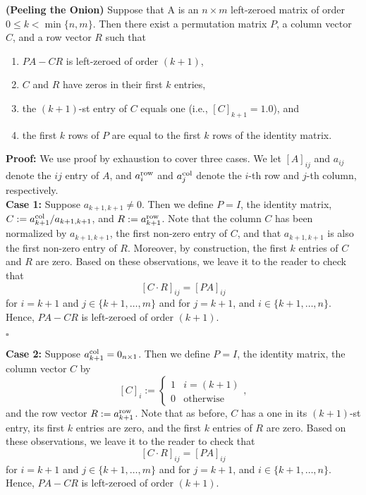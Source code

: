 \begin{lem}
\label{lem:PeelOnion}
\textbf{(Peeling the Onion)} Suppose that A is an $n \times m$ left-zeroed matrix of order $0\le  k< \min\{n,m\}$. Then there exist a permutation matrix $P$, a column vector $C$, and a row vector $R$ such that 
\begin{enumerate}
\setlength{\itemsep}{.2cm}
\renewcommand{\labelenumi}{(\alph{enumi})}
\item $P A -C R $ is left-zeroed of order $(k+1)$, 
\item $C$ and $R$ have zeros in their first $k$ entries, 
\item the $(k+1)$-st entry of $C$ equals one (i.e., $[C]_{k+1}=1.0$), and
\item the first $k$ rows of $P$ are equal to the first $k$ rows of the identity matrix.
\end{enumerate}
\end{lem}

\textbf{Proof:} We use proof by exhaustion to cover three cases. We let $[A]_{ij}$ and $a_{ij}$ denote the $ij$ entry of $A$, and $a^{\rm row}_{i}$ and $a^{\rm col}_{j}$ denote the $i$-th row and $j$-th column, respectively.\\

\textbf{Case 1:} Suppose $a_{k+1, k+1} \neq 0$. Then we define $P=I$, the identity matrix, $C:=a^{\rm col}_{k+1}/a_{k+1, k+1}$, and $R:= a^{\rm row}_{k+1}$. Note that the column $C$ has been normalized by $a_{k+1, k+1}$, the first non-zero entry of $C$, and that $a_{k+1, k+1}$ is also the first non-zero entry of $R$.  Moreover, by construction, the first $k$ entries of $C$ and $R$ are zero. Based on these observations, we leave it to the reader to check that
$$[C \cdot R]_{ij}=[P A]_{ij} $$
for $i=k+1$ and $j \in \{k+1, \ldots, m\}$ and for $j=k+1$, and $i \in \{k+1, \ldots,  n\}$. Hence, $P A - CR$ is left-zeroed of order $(k+1)$. 

\hfill $\square$

\textbf{Case 2:} Suppose $a^{\rm col}_{k+1} = 0_{n \times 1}$.  Then we define $P=I$, the identity matrix, the column vector $C$ by  
$$[C]_i:=\begin{cases} 1 & i = (k+1) \\ 0 & \text{otherwise}  \end{cases},$$ and the row vector
$R:= a^{\rm row}_{k+1}$. Note that as before, $C$ has a one in its $(k+1)$-st entry, its first $k$ entries are zero, and  the first $k$ entries of $R$ are zero. Based on these observations, we leave it to the reader to check that
$$[C \cdot R]_{ij}=[P A]_{ij} $$
for $i=k+1$ and $j \in \{k+1, \ldots, m\}$ and for $j=k+1$, and $i \in \{k+1, \ldots,  n\}$. Hence, $P A - CR$ is left-zeroed of order $(k+1)$. 

